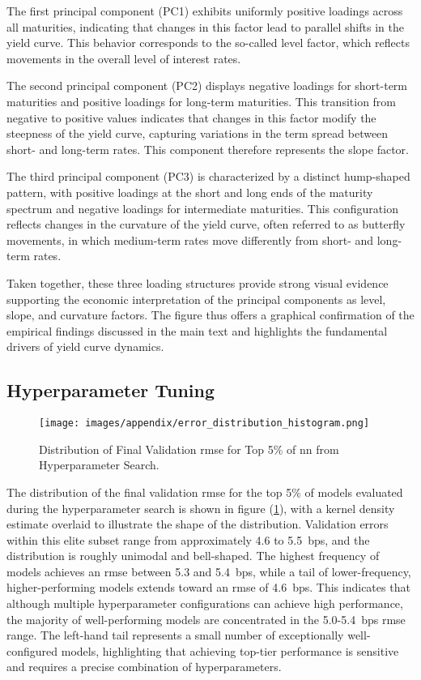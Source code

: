 The first principal component (PC1) exhibits uniformly positive loadings across all maturities, indicating that changes in this factor lead to parallel shifts in the yield curve. This behavior corresponds to the so-called level factor, which reflects movements in the overall level of interest rates.

The second principal component (PC2) displays negative loadings for short-term maturities and positive loadings for long-term maturities. This transition from negative to positive values indicates that changes in this factor modify the steepness of the yield curve, capturing variations in the term spread between short- and long-term rates. This component therefore represents the slope factor.

The third principal component (PC3) is characterized by a distinct hump-shaped pattern, with positive loadings at the short and long ends of the maturity spectrum and negative loadings for intermediate maturities. This configuration reflects changes in the curvature of the yield curve, often referred to as butterfly movements, in which medium-term rates move differently from short- and long-term rates.

Taken together, these three loading structures provide strong visual evidence supporting the economic interpretation of the principal components as level, slope, and curvature factors. The figure thus offers a graphical confirmation of the empirical findings discussed in the main text and highlights the fundamental drivers of yield curve dynamics.

\subsection{Hyperparameter Tuning}
\begin{figure}[H]
	\centering
	\texttt{[image: images/appendix/error\_distribution\_histogram.png]}
	\caption{Distribution of Final Validation \ac{rmse} for Top 5\% of \ac{nn} from Hyperparameter Search.}
	\label{fig:error_distribution_histogram}
\end{figure}
The distribution of the final validation \ac{rmse} for the top 5\% of models evaluated during the hyperparameter search is shown in figure (\ref{fig:error_distribution_histogram}), with a kernel density estimate overlaid to illustrate the shape of the distribution. Validation errors within this elite subset range from approximately 4.6 to 5.5~\ac{bps}, and the distribution is roughly unimodal and bell-shaped. The highest frequency of models achieves an \ac{rmse} between 5.3 and 5.4~\ac{bps}, while a tail of lower-frequency, higher-performing models extends toward an \ac{rmse} of 4.6~\ac{bps}. This indicates that although multiple hyperparameter configurations can achieve high performance, the majority of well-performing models are concentrated in the 5.0-5.4~\ac{bps} \ac{rmse} range. The left-hand tail represents a small number of exceptionally well-configured models, highlighting that achieving top-tier performance is sensitive and requires a precise combination of hyperparameters.

